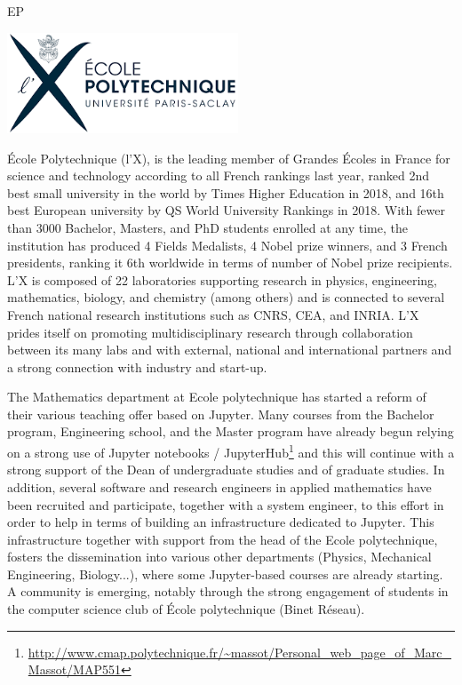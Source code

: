 \begin{sitedescription}{EP}

\begin{center}
\includegraphics[height=3cm]{Participants/Logos/EP.png}
\end{center}

\'Ecole Polytechnique (l'X), is the leading member of Grandes \'Ecoles in France
for science and technology according to all French rankings last year, ranked
2nd best small university in the world by Times Higher Education in 2018, and
16th best European university by QS World University Rankings in 2018. With
fewer than 3000 Bachelor, Masters, and PhD students enrolled at any time, the
institution has produced 4 Fields Medalists, 4 Nobel prize winners, and 3 French
presidents, ranking it 6th worldwide in terms of number of Nobel prize
recipients. L'X is composed of 22 laboratories supporting research in physics,
engineering, mathematics, biology, and chemistry (among others) and is connected
to several French national research institutions such as CNRS, CEA, and INRIA.
L'X prides itself on promoting multidisciplinary research through collaboration
between its many labs and with external, national and international partners and
a strong connection with industry and start-up.

The Mathematics department at Ecole polytechnique has started a reform of their
various teaching offer based on Jupyter. Many courses from the
Bachelor program, Engineering school, and the Master program have
already begun relying on a strong use of Jupyter notebooks /
JupyterHub\footnote{\url{http://www.cmap.polytechnique.fr/~massot/Personal_web_page_of_Marc_Massot/MAP551}} and this will continue with a strong support of the Dean of
undergraduate studies and of graduate studies. In addition, several software and
research engineers in applied mathematics have been recruited and
participate, together with a system engineer, to this effort in order to help in terms of
building an infrastructure dedicated to Jupyter.
This infrastructure together with support from the head of the Ecole polytechnique,
fosters the dissemination into various other
departments (Physics, Mechanical Engineering, Biology...), where some
Jupyter-based courses are already starting.
A community is emerging, notably through the strong engagement of
students in the computer science club of \'Ecole polytechnique (Binet R\'eseau).


\end{sitedescription}

